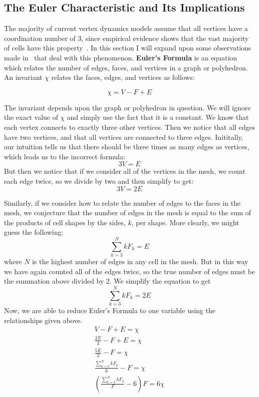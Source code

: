 \subsection{The Euler Characteristic and Its Implications}
The majority of current vertex dynamics models assume that all vertices have a coordination number of 3, since empirical evidence shows that the vast majority of cells have this property~\cite{EpithelialTopology,Overview}. In this section I will expand upon some observations made in~\cite{Soap} that deal with this phenomenon. \textbf{Euler's Formula} is an equation which relates the number of edges, faces, and vertices in a graph or polyhedron. An invariant $\chi$ relates the faces, edges, and vertices as follows:

\begin{equation}
\chi = V - F + E
\end{equation}

The invariant depends upon the graph or polyhedron in question. We will ignore the exact value of $\chi$ and simply use the fact that it is a constant. We know that each vertex connects to exactly three other vertices. Then we notice that all edges have two vertices, and that all vertices are connected to three edges. Inititally, our intuition tells us that there should be three times as many edges as vertices, which leads us to the incorrect formula:
\begin{equation}
3V = E
\end{equation}
But then we notice that if we consider all of the vertices in the mesh, we count each edge twice, so we divide by two and then simplify to get:
\begin{equation}
3V = 2E
\end{equation}

Similarly, if we consider how to relate the number of edges to the faces in the mesh, we conjecture that the number of edges in the mesh is equal to the sum of the products of cell shapes by the sides, $k$,  per shape. More clearly, we might guess the following:
\begin{equation}
\sum_{k=3}^N kF_k = E
\end{equation}
where $N$ is the highest number of edges in any cell in the mesh. But in this way we have again counted all of the edges twice, so the true number of edges must be the summation above divided by 2. We simplify the equation to get
\begin{equation}
\sum_{k=3}^N kF_k = 2E
\end{equation}
Now, we are able to reduce Euler's Formula to one variable using the relationships given above.
\begin{gather}
V - F + E = \chi\\
\frac{2E}3 - F + E = \chi\\
\frac{5E}3 - F = \chi\\
\frac{\sum_{k=3}^N kF_k}{6} - F = \chi\\
(\frac{\sum_{k=3}^N kF_k}{F} - 6)F = 6\chi
\end{gather}

